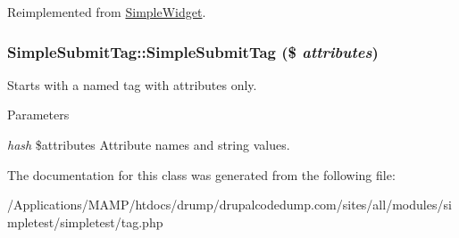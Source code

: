 Reimplemented from \hyperlink{class_simple_widget_a9e048a450e2d29a601e672deda9fa869}{SimpleWidget}.\hypertarget{class_simple_submit_tag_aa14e42ef1feaa738803f342e125fb316}{
\subsubsection[{SimpleSubmitTag}]{\setlength{\rightskip}{0pt plus 5cm}SimpleSubmitTag::SimpleSubmitTag (\$ {\em attributes})}}
\label{class_simple_submit_tag_aa14e42ef1feaa738803f342e125fb316}
Starts with a named tag with attributes only. 
\begin{DoxyParams}{Parameters}
\item[{\em hash}]\$attributes Attribute names and string values. \end{DoxyParams}


The documentation for this class was generated from the following file:\begin{DoxyCompactItemize}
\item 
/Applications/MAMP/htdocs/drump/drupalcodedump.com/sites/all/modules/simpletest/simpletest/tag.php\end{DoxyCompactItemize}
